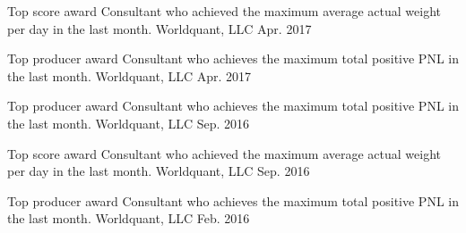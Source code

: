 \begin{cvhonors}
  \cvhonor
    {Top score award} %
    {Consultant who achieved the maximum average actual weight per day in the last month.} %
    {Worldquant, LLC} %
    {Apr. 2017} %

   \cvhonor
    {Top producer award} %
    {Consultant who achieves the maximum total positive PNL in the last month.} %
    {Worldquant, LLC} %
    {Apr. 2017} %

  \cvhonor
    {Top producer award} %
    {Consultant who achieves the maximum total positive PNL in the last month.} %
    {Worldquant, LLC} %
    {Sep. 2016} %

  \cvhonor
    {Top score award} %
    {Consultant who achieved the maximum average actual weight per day in the last month.} %
    {Worldquant, LLC} %
    {Sep. 2016} %

  \cvhonor
    {Top producer award} %
    {Consultant who achieves the maximum total positive PNL in the last month.} %
    {Worldquant, LLC} %
    {Feb. 2016} %

\end{cvhonors}
